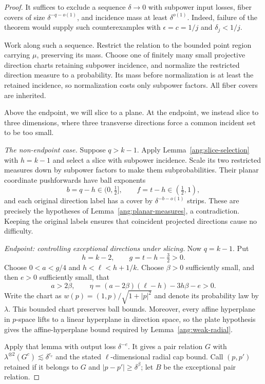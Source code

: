 \begin{proof}
It suffices to exclude a sequence $\delta\to0$ with subpower input losses, fiber covers of size $\delta^{-q-o(1)}$, and incidence mass at least $\delta^{o(1)}$. Indeed, failure of the theorem would supply such counterexamples with $\epsilon=c=1/j$ and $\delta_j<1/j$.

Work along such a sequence. Restrict the relation to the bounded point region carrying $\mu$, preserving its mass. Choose one of finitely many small projective direction charts retaining subpower incidence, and normalize the restricted direction measure to a probability. Its mass before normalization is at least the retained incidence, so normalization costs only subpower factors. All fiber covers are inherited.

Above the endpoint, we will slice to a plane. At the endpoint, we instead slice to three dimensions, where three transverse directions force a common incident set to be too small.

\emph{The non-endpoint case.}
Suppose $q>k-1$. Apply Lemma~\ref{ang:slice-selection} with $h=k-1$ and select a slice with subpower incidence. Scale its two restricted measures down by subpower factors to make them subprobabilities. Their planar coordinate pushforwards have ball exponents
\[
 b=q-h\in(0,\tfrac12],\qquad f=t-h\in(\tfrac12,1),
\]
and each original direction label has a cover by $\delta^{-b-o(1)}$ strips. These are precisely the hypotheses of Lemma~\ref{ang:planar-measures}, a contradiction. Keeping the original labels ensures that coincident projected directions cause no difficulty.

\emph{Endpoint: controlling exceptional directions under slicing.}
Now $q=k-1$. Put
\[
 h=k-2,\qquad g=t-h-\tfrac32>0.
\]
Choose $0<a<g/4$ and $h<\ell<h+1/k$. Choose $\beta>0$ sufficiently small, and then $e>0$ sufficiently small, that
\[
 a>2\beta,\qquad
 \eta=(a-2\beta)(\ell-h)-3h\beta-e>0.
\]
Write the chart as $w(p)=(1,p)/\sqrt{1+|p|^2}$ and denote its probability law by $\lambda$. This bounded chart preserves ball bounds. Moreover, every affine hyperplane in $p$-space lifts to a linear hyperplane in direction space, so the plate hypothesis gives the affine-hyperplane bound required by Lemma~\ref{ang:weak-radial}.

Apply that lemma with output loss $\delta^{-e}$. It gives a pair relation $G$ with
$\lambda^{\otimes2}(G^c)\lesssim\delta^{c_e}$ and the stated $\ell$-dimensional radial cap bound. Call $(p,p')$ retained if it belongs to $G$ and $|p-p'|\ge\delta^\beta$; let $B$ be the exceptional pair relation.


\end{proof}
